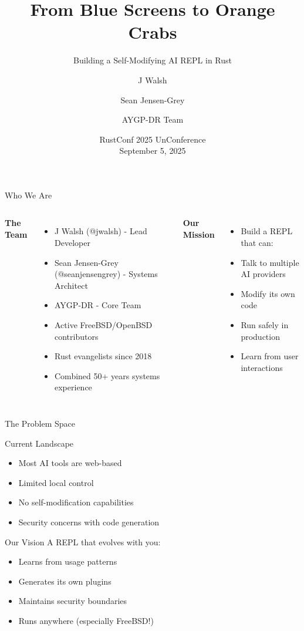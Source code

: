 \documentclass[aspectratio=169]{beamer}
\title{From Blue Screens to Orange Crabs}
\subtitle{Building a Self-Modifying AI REPL in Rust}
\author{J Walsh \and Sean Jensen-Grey \and AYGP-DR Team}
\date{RustConf 2025 UnConference \\ September 5, 2025}
\institute{Views expressed are those of the authors}
\begin{document}
\maketitle

\begin{frame}{Who We Are}
\begin{columns}
\textbf{The Team}
\begin{itemize}
\item J Walsh (@jwalsh) - Lead Developer
\item Sean Jensen-Grey (@seanjensengrey) - Systems Architect  
\item AYGP-DR - Core Team
\item Active FreeBSD/OpenBSD contributors
\item Rust evangelists since 2018
\item Combined 50+ years systems experience
\end{itemize}

\textbf{Our Mission}
\begin{itemize}
\item Build a REPL that can:
\item Talk to multiple AI providers
\item Modify its own code
\item Run safely in production
\item Learn from user interactions
\end{itemize}
\end{columns}
\end{frame}

\begin{frame}{The Problem Space}
\begin{block}{Current Landscape}
\begin{itemize}
\item Most AI tools are web-based
\item Limited local control
\item No self-modification capabilities
\item Security concerns with code generation
\end{itemize}
\end{block}

\begin{alertblock}{Our Vision}
A REPL that evolves with you:
\begin{itemize}
\item Learns from usage patterns
\item Generates its own plugins
\item Maintains security boundaries
\item Runs anywhere (especially FreeBSD!)
\end{itemize}
\end{alertblock}
\end{frame}
\end{document}
